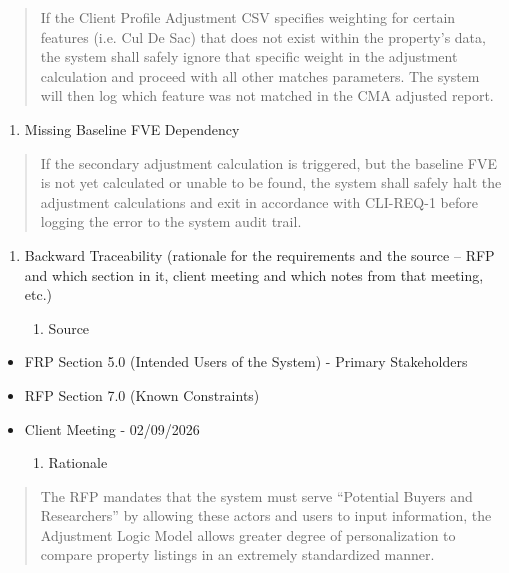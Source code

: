 \begin{quote}
If the Client Profile Adjustment CSV specifies weighting for certain
features (i.e. Cul De Sac) that does not exist within the property's
data, the system shall safely ignore that specific weight in the
adjustment calculation and proceed with all other matches parameters.
The system will then log which feature was not matched in the CMA
adjusted report.
\end{quote}

\begin{enumerate}
\def\labelenumi{\roman{enumi}.}
\setcounter{enumi}{1}
\item
  Missing Baseline FVE Dependency
\end{enumerate}

\begin{quote}
If the secondary adjustment calculation is triggered, but the baseline
FVE is not yet calculated or unable to be found, the system shall safely
halt the adjustment calculations and exit in accordance with CLI-REQ-1
before logging the error to the system audit trail.
\end{quote}

\begin{enumerate}
\def\labelenumi{\alph{enumi}.}
\setcounter{enumi}{1}
\item
  Backward Traceability (rationale for the requirements and the source
  -- RFP and which section in it, client meeting and which notes from
  that meeting, etc.)

  \begin{enumerate}
  \def\labelenumii{\roman{enumii}.}
  \item
    Source
  \end{enumerate}
\end{enumerate}

\begin{itemize}
\item
  FRP Section 5.0 (Intended Users of the System) - Primary Stakeholders
\item
  RFP Section 7.0 (Known Constraints)
\item
  Client Meeting - 02/09/2026

  \begin{enumerate}
  \def\labelenumi{\roman{enumi}.}
  \item
    Rationale
  \end{enumerate}
\end{itemize}

\begin{quote}
The RFP mandates that the system must serve ``Potential Buyers and
Researchers'' by allowing these actors and users to input information,
the Adjustment Logic Model allows greater degree of personalization to
compare property listings in an extremely standardized manner.
\end{quote}

